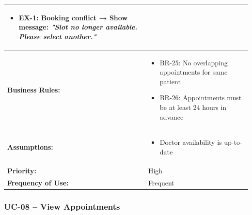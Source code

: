 \documentclass[12pt,a4paper]{article}
\begin{document}
\begin{longtable}{|p{4.5cm}|p{10.5cm}|}
\begin{itemize}
  \item EX-1: Booking conflict → Show message: \textit{"Slot no longer available. Please select another."}
\end{itemize} \\
\hline
\textbf{Business Rules:} &
\begin{itemize}
  \item BR-25: No overlapping appointments for same patient
  \item BR-26: Appointments must be at least 24 hours in advance
\end{itemize} \\
\hline
\textbf{Assumptions:} &
\begin{itemize}
  \item Doctor availability is up-to-date
\end{itemize} \\
\hline
\textbf{Priority:} & High \\
\hline
\textbf{Frequency of Use:} & Frequent \\
\hline
\end{longtable}

\subsubsection{UC-08 – View Appointments}
\end{document}
